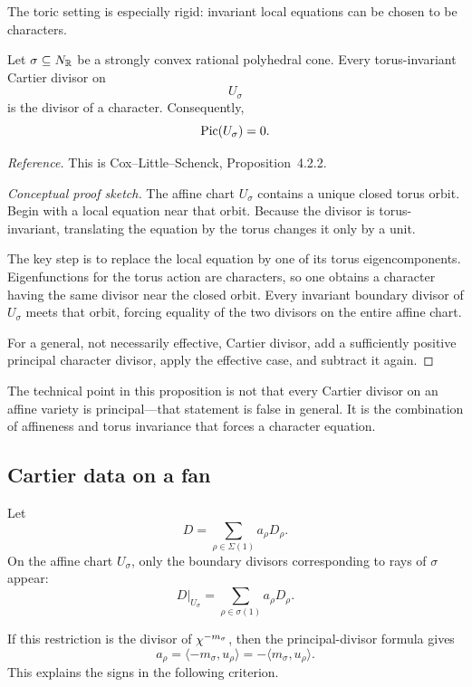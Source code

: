 The toric setting is especially rigid: invariant local equations can
be chosen to be characters.

\begin{proposition}
\label{prop:affine-invariant-cartier-principal}
Let \(\sigma\subseteq N_{\mathbb{R}}\) be a strongly convex rational
polyhedral cone. Every torus-invariant Cartier divisor on
\[
U_\sigma
\]
is the divisor of a character. Consequently,
\[
\operatorname{Pic}(U_\sigma)=0.
\]
\end{proposition}

\noindent
\textit{Reference.}
This is Cox--Little--Schenck, Proposition~4.2.2.

\begin{proof}[Conceptual proof sketch]
The affine chart \(U_\sigma\) contains a unique closed torus orbit.
Begin with a local equation near that orbit. Because the divisor is
torus-invariant, translating the equation by the torus changes it only
by a unit.

The key step is to replace the local equation by one of its torus
eigencomponents. Eigenfunctions for the torus action are characters,
so one obtains a character having the same divisor near the closed
orbit. Every invariant boundary divisor of \(U_\sigma\) meets that
orbit, forcing equality of the two divisors on the entire affine
chart.

For a general, not necessarily effective, Cartier divisor, add a
sufficiently positive principal character divisor, apply the effective
case, and subtract it again.
\end{proof}

The technical point in this proposition is not that every Cartier
divisor on an affine variety is principal—that statement is false in
general. It is the combination of affineness and torus invariance that
forces a character equation.

\subsection{Cartier data on a fan}

Let
\[
D=\sum_{\rho\in\Sigma(1)}a_\rho D_\rho.
\]
On the affine chart \(U_\sigma\), only the boundary divisors
corresponding to rays of \(\sigma\) appear:
\[
D|_{U_\sigma}
=
\sum_{\rho\in\sigma(1)}a_\rho D_\rho.
\]

If this restriction is the divisor of \(\chi^{-m_\sigma}\), then
the principal-divisor formula gives
\[
a_\rho
=
\langle -m_\sigma,u_\rho\rangle
=
-\langle m_\sigma,u_\rho\rangle.
\]
This explains the signs in the following criterion.

